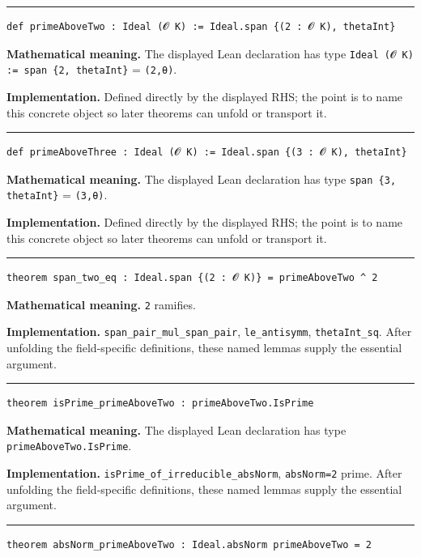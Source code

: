 \documentclass[UTF8,a4paper,11pt,fontset=fandol]{ctexart}
\theoremstyle{definition}
\newcommand{\statementsep}{\par\medskip\hrule\medskip}
\begin{document}
\statementsep
\begin{verbatim}
def primeAboveTwo : Ideal (𝓞 K) := Ideal.span {(2 : 𝓞 K), thetaInt}
\end{verbatim}
\noindent\textbf{Mathematical meaning.} The displayed Lean declaration has type \texttt{Ideal (𝓞 K) := span \{2, thetaInt\}} = \texttt{(2,θ)}.\par
\noindent\textbf{Implementation.} Defined directly by the displayed RHS; the point is to name this concrete object so later theorems can unfold or transport it.\par
\statementsep
\begin{verbatim}
def primeAboveThree : Ideal (𝓞 K) := Ideal.span {(3 : 𝓞 K), thetaInt}
\end{verbatim}
\noindent\textbf{Mathematical meaning.} The displayed Lean declaration has type \texttt{span \{3, thetaInt\}} = \texttt{(3,θ)}.\par
\noindent\textbf{Implementation.} Defined directly by the displayed RHS; the point is to name this concrete object so later theorems can unfold or transport it.\par
\statementsep
\begin{verbatim}
theorem span_two_eq : Ideal.span {(2 : 𝓞 K)} = primeAboveTwo ^ 2
\end{verbatim}
\noindent\textbf{Mathematical meaning.} \texttt{2} ramifies.\par
\noindent\textbf{Implementation.} \texttt{span\_\allowbreak{}pair\_\allowbreak{}mul\_\allowbreak{}span\_\allowbreak{}pair}, \texttt{le\_\allowbreak{}antisymm}, \texttt{thetaInt\_\allowbreak{}sq}. After unfolding the field-specific definitions, these named lemmas supply the essential argument.\par
\statementsep
\begin{verbatim}
theorem isPrime_primeAboveTwo : primeAboveTwo.IsPrime
\end{verbatim}
\noindent\textbf{Mathematical meaning.} The displayed Lean declaration has type \texttt{primeAboveTwo.\allowbreak{}IsPrime}.\par
\noindent\textbf{Implementation.} \texttt{isPrime\_\allowbreak{}of\_\allowbreak{}irreducible\_\allowbreak{}absNorm}, \texttt{absNorm=2} prime. After unfolding the field-specific definitions, these named lemmas supply the essential argument.\par
\statementsep
\begin{verbatim}
theorem absNorm_primeAboveTwo : Ideal.absNorm primeAboveTwo = 2
\end{verbatim}
\end{document}
